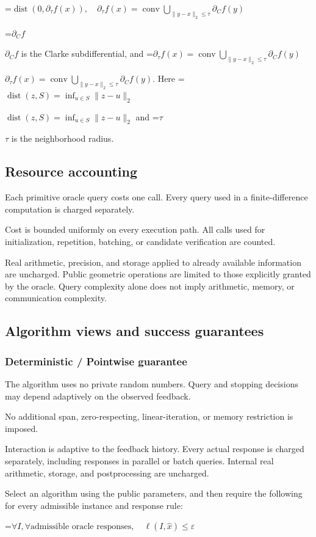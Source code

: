 \documentclass[10pt,a4paper]{article}
\newcommand{\AtlasMath}[1]{\par\begingroup\centering\setbox0=\hbox{$\displaystyle #1$}\ifdim\wd0>1.4\linewidth\typeout{ATLAS WIDE FORMULA: \the\wd0}\fi\ifdim\wd0>\linewidth\resizebox{\linewidth}{!}{\box0}\else\box0\fi\par\endgroup}
\newcommand{\AtlasInlineMath}[1]{\begingroup\setbox0=\hbox{$#1$}\ifdim\wd0>.4\linewidth\endgroup\AtlasMath{#1}\else\endgroup$#1$\fi}
\begin{document}
\AtlasMath{\operatorname{dist}(0,\partial_\tau f(x)),\quad\partial_\tau f(x)=\operatorname{conv}\bigcup_{\|y-x\|_2\le\tau}\partial_C f(y)}


\AtlasInlineMath{\partial_C f} is the Clarke subdifferential, and \AtlasInlineMath{\partial_\tau f(x)=\operatorname{conv}\bigcup_{\|y-x\|_2\le\tau}\partial_C f(y)}. Here \AtlasInlineMath{\operatorname{dist}(z,S)=\inf_{u\in S}\|z-u\|_2} and \AtlasInlineMath{\tau} is the neighborhood radius.

\subsection{Resource accounting}
Each primitive oracle query costs one call. Every query used in a finite-difference computation is charged separately.

Cost is bounded uniformly on every execution path. All calls used for initialization, repetition, batching, or candidate verification are counted.

Real arithmetic, precision, and storage applied to already available information are uncharged. Public geometric operations are limited to those explicitly granted by the oracle. Query complexity alone does not imply arithmetic, memory, or communication complexity.

\subsection{Algorithm views and success guarantees}
\subsubsection{Deterministic / Pointwise guarantee}
The algorithm uses no private random numbers. Query and stopping decisions may depend adaptively on the observed feedback.

No additional span, zero-respecting, linear-iteration, or memory restriction is imposed.

Interaction is adaptive to the feedback history. Every actual response is charged separately, including responses in parallel or batch queries. Internal real arithmetic, storage, and postprocessing are uncharged.

Select an algorithm using the public parameters, and then require the following for every admissible instance and response rule:


\AtlasMath{\forall I,\forall\text{admissible oracle responses},\quad\ell(I,\widehat{x})\le\varepsilon}
\end{document}

